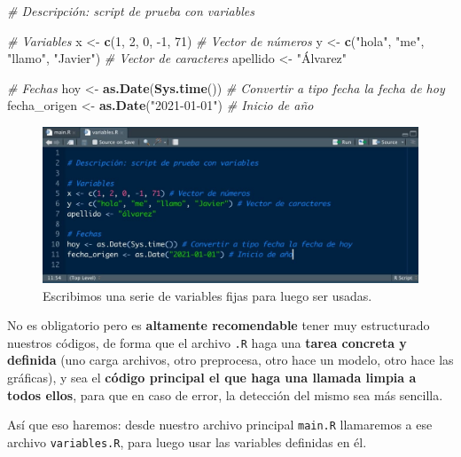 \documentclass[11pt,]{book}
\newenvironment{Shaded}{\begin{snugshade}}{\end{snugshade}}
\newcommand{\CommentTok}[1]{\textcolor[rgb]{0.37,0.37,0.37}{\textit{#1}}}
\newcommand{\DecValTok}[1]{\textcolor[rgb]{0.06,0.06,0.06}{#1}}
\newcommand{\KeywordTok}[1]{\textcolor[rgb]{0.27,0.27,0.27}{\textbf{#1}}}
\newcommand{\NormalTok}[1]{#1}
\newcommand{\StringTok}[1]{\textcolor[rgb]{0.5,0.5,0.5}{#1}}
\begin{document}
\begin{Shaded}
\begin{Highlighting}[]
\CommentTok{# Descripción: script de prueba con variables}

\CommentTok{# Variables}
\NormalTok{x <-}\StringTok{ }\KeywordTok{c}\NormalTok{(}\DecValTok{1}\NormalTok{, }\DecValTok{2}\NormalTok{, }\DecValTok{0}\NormalTok{, }\DecValTok{-1}\NormalTok{, }\DecValTok{71}\NormalTok{) }\CommentTok{# Vector de números}
\NormalTok{y <-}\StringTok{ }\KeywordTok{c}\NormalTok{(}\StringTok{"hola"}\NormalTok{, }\StringTok{"me"}\NormalTok{, }\StringTok{"llamo"}\NormalTok{, }\StringTok{"Javier"}\NormalTok{) }\CommentTok{# Vector de caracteres}
\NormalTok{apellido <-}\StringTok{ "Álvarez"}

\CommentTok{# Fechas}
\NormalTok{hoy <-}\StringTok{ }\KeywordTok{as.Date}\NormalTok{(}\KeywordTok{Sys.time}\NormalTok{()) }\CommentTok{# Convertir a tipo fecha la fecha de hoy}
\NormalTok{fecha_origen <-}\StringTok{ }\KeywordTok{as.Date}\NormalTok{(}\StringTok{"2021-01-01"}\NormalTok{) }\CommentTok{# Inicio de año}
\end{Highlighting}
\end{Shaded}

\begin{figure}

{\centering \includegraphics[width=0.5\linewidth]{./img/carpeta_codigos2} 

}

\caption{Escribimos una serie de variables fijas para luego ser usadas.}\label{fig:carpeta-codigos2}
\end{figure}

No es obligatorio pero es \textbf{altamente recomendable} tener muy estructurado nuestros códigos, de forma que el archivo \texttt{.R} haga una \textbf{tarea concreta y definida} (uno carga archivos, otro preprocesa, otro hace un modelo, otro hace las gráficas), y sea el \textbf{código principal el que haga una llamada limpia a todos ellos}, para que en caso de error, la detección del mismo sea más sencilla.

Así que eso haremos: desde nuestro archivo principal \texttt{main.R} llamaremos a ese archivo \texttt{variables.R}, para luego usar las variables definidas en él.
\end{document}
